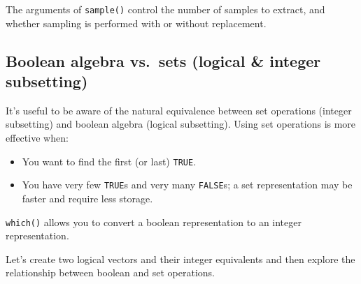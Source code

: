 \documentclass[]{book}
\theoremstyle{definition}
\theoremstyle{definition}
\theoremstyle{definition}
\theoremstyle{remark}
\begin{document}
The arguments of \texttt{sample()} control the number of samples to
extract, and whether sampling is performed with or without replacement.

\subsection{Boolean algebra vs.~sets (logical \& integer
subsetting)}\label{boolean-algebra-vs.sets-logical-integer-subsetting}

It's useful to be aware of the natural equivalence between set
operations (integer subsetting) and boolean algebra (logical
subsetting). Using set operations is more effective when:

\begin{itemize}
\item
  You want to find the first (or last) \texttt{TRUE}.
\item
  You have very few \texttt{TRUE}s and very many \texttt{FALSE}s; a set
  representation may be faster and require less storage.
\end{itemize}

\texttt{which()} allows you to convert a boolean representation to an
integer representation.

Let's create two logical vectors and their integer equivalents and then
explore the relationship between boolean and set operations.
\end{document}
